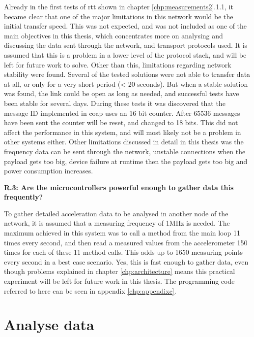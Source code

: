 \noindent Already in the first tests of \gls{rtt} shown in chapter \ref{chp:measurements2}.1.1, it became clear that one of the major limitations in this network would be the initial transfer speed. This was not expected, and was not included as one of the main objectives in this thesis, which concentrates more on analysing and discussing the data sent through the network, and transport protocols used. It is assumed that this is a problem in a lower level of the protocol stack, and will be left for future work to solve. Other than this, limitations regarding network stability were found. Several of the tested solutions were not able to transfer data at all, or only for a very short period (< 20 seconds). But when a stable solution was found, the link could be open as long as needed, and successful tests have been stable for several days. During these tests it was discovered that the message ID implemented in \gls{coap} uses an 16 bit counter. After 65536 messages have been sent the counter will be reset, and changed to 18 bits. This did not affect the performance in this system, and will most likely not be a problem in other systems either. Other limitations discussed in detail in this thesis was the frequency data can be sent through the network, unstable connections when the \gls{payload} gets too big, device failure at runtime then the \gls{payload} gets too big and power consumption increases. 

\noindent\textbf{R.3: Are the microcontrollers powerful enough to gather data this frequently?}

\noindent To gather detailed acceleration data to be analysed in another node of the network, it is assumed that a measuring frequency of 1MHz is needed. The maximum achieved in this system was to call a method from the main loop 11 times every second, and then read a measured values from the accelerometer 150 times for each of these 11 method calls. This adds up to 1650 measuring points every second in a best case scenario. Yes, this is fast enough to gather data, even though problems explained in chapter \ref{chp:architecture} means this practical experiment will be left for future work in this thesis. The programming code referred to here can be seen in appendix \ref{chp:appendixc}. 


\section{Analyse data}

